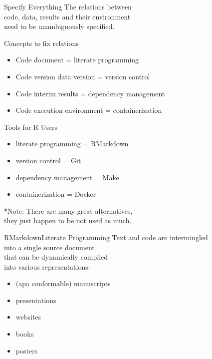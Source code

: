 \documentclass[12pt,t]{beamer}
\begin{document}
{\begin{frame}[c]{Specify Everything}
  \textcolor<3->{lolit}{The relations between\\
  \textcolor<2>{hilit}{code}, \textcolor<2>{hilit}{data}, \textcolor<2>{hilit}{results} and their \textcolor<2>{hilit}{environment}\\
  need to be \textcolor<2>{vhilit}{unambiguously} specified.\\}
  \vspace{10mm}
\end{frame}

\begin{frame}[c]{Concepts to fix relations}
  \begin{itemize}
    \item Code \textemdash{} document = literate programming
    \item Code version \textemdash{} data version = version control
    \item Code \textemdash{} interim results = dependency management
    \item Code \textemdash{} execution environment = containerization
  \end{itemize}
\end{frame}

\begin{frame}[c]{Tools for R Users}
  \begin{itemize}
    \item literate programming = RMarkdown
    \item version control = Git
    \item dependency management = Make
    \item containerization = Docker
  \end{itemize}
  \vfill
  \textcolor{lolit}{*Note: There are many great alternatives,\\they just happen to be not used as much.}
\end{frame}

\begin{frame}[c]{RMarkdown\textemdash{}Literate Programming}
  Text and code are intermingled\\
  into a single source document\\
  that can be dynamically compiled\\
  into various representations:
  \begin{itemize}
    \item (apa conformable) manuscripts
    \item presentations
    \item websites
    \item books
    \item posters
  \end{itemize}
\end{frame}

}
\end{document}
